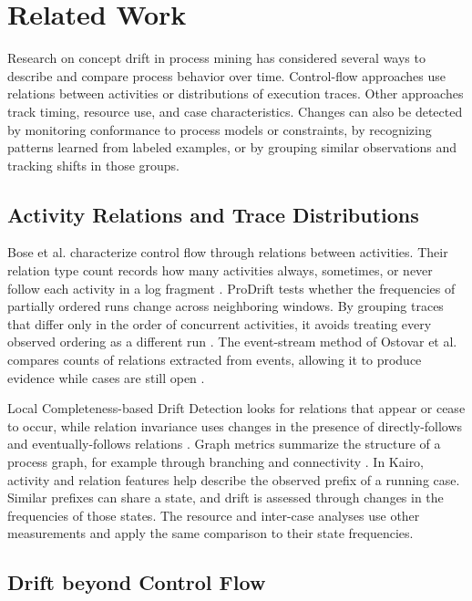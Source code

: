 \section{Related Work}
\label{sec:related-work}

Research on concept drift in process mining has considered several ways to describe and compare process behavior over time. Control-flow approaches use relations between activities or distributions of execution traces. Other approaches track timing, resource use, and case characteristics. Changes can also be detected by monitoring conformance to process models or constraints, by recognizing patterns learned from labeled examples, or by grouping similar observations and tracking shifts in those groups.

\subsection{Activity Relations and Trace Distributions}

Bose et al. characterize control flow through relations between activities. Their relation type count records how many activities always, sometimes, or never follow each activity in a log fragment \cite{bose2011handling}. ProDrift tests whether the frequencies of partially ordered runs change across neighboring windows. By grouping traces that differ only in the order of concurrent activities, it avoids treating every observed ordering as a different run \cite{maaradji2017detecting}. The event-stream method of Ostovar et al. compares counts of relations extracted from events, allowing it to produce evidence while cases are still open \cite{ostovar2016streams}.

Local Completeness-based Drift Detection looks for relations that appear or cease to occur, while relation invariance uses changes in the presence of directly-follows and eventually-follows relations \cite{lin2022lcdd,zheng2017detecting}. Graph metrics summarize the structure of a process graph, for example through branching and connectivity \cite{seeliger2017graph}. In Kairo, activity and relation features help describe the observed prefix of a running case. Similar prefixes can share a state, and drift is assessed through changes in the frequencies of those states. The resource and inter-case analyses use other measurements and apply the same comparison to their state frequencies.

\subsection{Drift beyond Control Flow}

